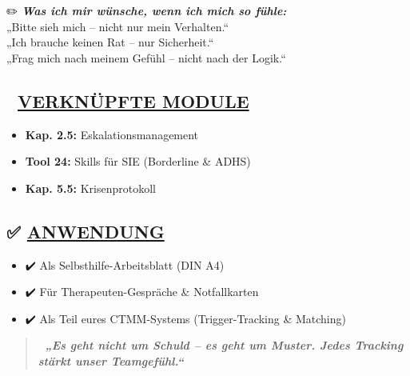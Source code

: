 ✏️ \emph{\textbf{Was ich mir wünsche, wenn ich mich so fühle:}}\\
„Bitte sieh mich -- nicht nur mein Verhalten.``\\
„Ich brauche keinen Rat -- nur Sicherheit.``\\
„Frag mich nach meinem Gefühl -- nicht nach der Logik.``

\hypertarget{verknuxfcpfte-module}{%
\subsection{\texorpdfstring{🔗 \textbf{\ul{VERKNÜPFTE MODULE}}}{🔗 VERKNÜPFTE MODULE}}\label{verknuxfcpfte-module}}

\begin{itemize}
\tightlist
\item
  \textbf{Kap. 2.5:} Eskalationsmanagement
\item
  \textbf{Tool 24:} Skills für SIE (Borderline \& ADHS)
\item
  \textbf{Kap. 5.5:} Krisenprotokoll
\end{itemize}

\hypertarget{anwendung}{%
\subsection{\texorpdfstring{✅ \textbf{\ul{ANWENDUNG}}}{✅ ANWENDUNG}}\label{anwendung}}

\begin{itemize}
\tightlist
\item
  ✔️ Als Selbsthilfe-Arbeitsblatt (DIN A4)
\item
  ✔️ Für Therapeuten-Gespräche \& Notfallkarten
\item
  ✔️ Als Teil eures CTMM-Systems (Trigger-Tracking \& Matching)
\end{itemize}

\begin{quote}
💬 \emph{\textbf{„Es geht nicht um Schuld -- es geht um Muster. Jedes Tracking stärkt unser Teamgefühl.``}}
\end{quote}


